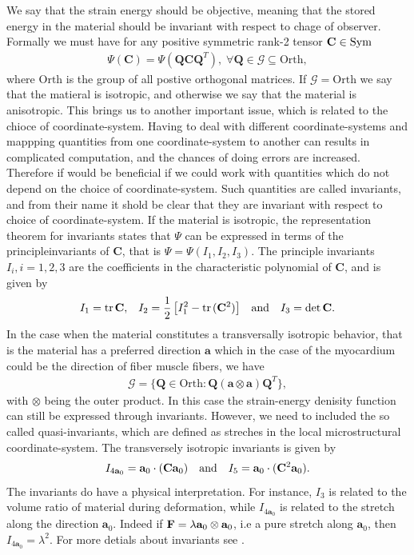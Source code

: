 We say that the strain energy should be objective, meaning that the
stored energy in the material should be invariant with respect to
chage of observer. Formally we must have for any positive symmetric
rank-2 tensor $\mathbf{C} \in \mathrm{Sym}$ 
\begin{align}
  \Psi(\mathbf{C}) = \Psi(\mathbf{Q}\mathbf{C}\mathbf{Q}^T), \; \forall \mathbf{Q} \in \mathcal{G} \subseteq \mathrm{Orth},
\end{align}
where $\mathrm{Orth}$ is the group of all postive orthogonal matrices.
If $\mathcal{G} = \mathrm{Orth}$ we say that the matieral is
isotropic, and otherwise we say that the material is anisotropic.
This brings us to another important issue, which is related to the
chioce of coordinate-system. Having to deal with different
coordinate-systems and mappping quantities from one coordinate-system
to another can results in complicated computation, and the chances of
doing errors are increased. Therefore if would be beneficial if we
could work with quantities which do not depend on the choice of
coordinate-system. Such quantities are called invariants, and from their
name it shold be clear that they are invariant with respect to choice
of coordinate-system. 
If the material is isotropic, the representation theorem for
invariants states that $\Psi$ can be expressed in terms of the
principleinvariants of $\mathbf{C}$, that is $\Psi = \Psi(I_1, I_2,
I_3)$. The principle invariants $I_i, i=1,2,3$ are the coefficients in
the characteristic polynomial of $\mathbf{C}$, and is given by 
\begin{align}
  I_1 = \mathrm{tr} \hspace{0.05cm} \mathbf{C},  && I_2 = \frac{1}{2}\left[ I_1^2 - \mathrm{tr} \hspace{0.05cm}(\mathbf{C}^2)\right] && \text{and} && I_3 = \det \mathbf{C}.
\end{align}
In the case when the material constitutes a transversally isotropic
behavior, that is the material has a preferred direction $\mathbf{a}$
which in the case of the myocardium could be the direction of fiber
muscle fibers, we have
\begin{align*}
  \mathcal{G} = \{ \mathbf{Q} \in \mathrm{Orth}: \mathbf{Q}(\mathbf{a}\otimes\mathbf{a})\mathbf{Q}^T\},
\end{align*}
with $\otimes$ being the outer product. In this case the strain-energy
denisity function can still be expressed through invariants. However,
we need to included the so called quasi-invariants, which are defined
as streches in the local microstructural coordinate-system. The
transversely isotropic invariants is given by
\begin{align}
  I_{4\mathbf{a}_0 } = \mathbf{a}_0 \cdot (\mathbf{C} \mathbf{a}_0) && \text{and} && I_5 = \mathbf{a}_0 \cdot (\mathbf{C}^2 \mathbf{a}_0).
\end{align}
The invariants do have a physical interpretation. For instance, $I_3$
is related to the volume ratio of material during deformation, while
$I_{4\mathbf{a}_0 } $ is related to the stretch along the direction
$\mathbf{a}_0 $. Indeed if $\mathbf{F} = \lambda \mathbf{a}_0 \otimes
\mathbf{a}_0$, i.e a pure stretch along $\mathbf{a}_0$, then
$I_{4\mathbf{a}_0 } = \lambda^2$.
For more detials about invariants see \cite{holzapfel2009constitutive,liu1982representations}.

